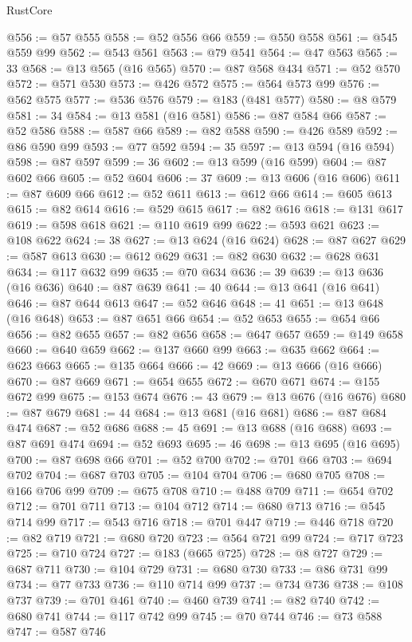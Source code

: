 \begin{lexlean}{RustCore}
\begin{coremodule}
@556 := @57 @555
@558 := @52 @556 @66
@559 := @550 @558
@561 := @545 @559 @99
@562 := @543 @561
@563 := @79 @541
@564 := @47 @563
@565 := 33
@568 := @13 @565 (@16 @565)
@570 := @87 @568 @434
@571 := @52 @570
@572 := @571 @530
@573 := @426 @572
@575 := @564 @573 @99
@576 := @562 @575
@577 := @536 @576
@579 := @183 (@481 @577)
@580 := @8 @579
@581 := 34
@584 := @13 @581 (@16 @581)
@586 := @87 @584 @66
@587 := @52 @586
@588 := @587 @66
@589 := @82 @588
@590 := @426 @589
@592 := @86 @590 @99
@593 := @77 @592
@594 := 35
@597 := @13 @594 (@16 @594)
@598 := @87 @597
@599 := 36
@602 := @13 @599 (@16 @599)
@604 := @87 @602 @66
@605 := @52 @604
@606 := 37
@609 := @13 @606 (@16 @606)
@611 := @87 @609 @66
@612 := @52 @611
@613 := @612 @66
@614 := @605 @613
@615 := @82 @614
@616 := @529 @615
@617 := @82 @616
@618 := @131 @617
@619 := @598 @618
@621 := @110 @619 @99
@622 := @593 @621
@623 := @108 @622
@624 := 38
@627 := @13 @624 (@16 @624)
@628 := @87 @627
@629 := @587 @613
@630 := @612 @629
@631 := @82 @630
@632 := @628 @631
@634 := @117 @632 @99
@635 := @70 @634
@636 := 39
@639 := @13 @636 (@16 @636)
@640 := @87 @639
@641 := 40
@644 := @13 @641 (@16 @641)
@646 := @87 @644 @613
@647 := @52 @646
@648 := 41
@651 := @13 @648 (@16 @648)
@653 := @87 @651 @66
@654 := @52 @653
@655 := @654 @66
@656 := @82 @655
@657 := @82 @656
@658 := @647 @657
@659 := @149 @658
@660 := @640 @659
@662 := @137 @660 @99
@663 := @635 @662
@664 := @623 @663
@665 := @135 @664
@666 := 42
@669 := @13 @666 (@16 @666)
@670 := @87 @669
@671 := @654 @655
@672 := @670 @671
@674 := @155 @672 @99
@675 := @153 @674
@676 := 43
@679 := @13 @676 (@16 @676)
@680 := @87 @679
@681 := 44
@684 := @13 @681 (@16 @681)
@686 := @87 @684 @474
@687 := @52 @686
@688 := 45
@691 := @13 @688 (@16 @688)
@693 := @87 @691 @474
@694 := @52 @693
@695 := 46
@698 := @13 @695 (@16 @695)
@700 := @87 @698 @66
@701 := @52 @700
@702 := @701 @66
@703 := @694 @702
@704 := @687 @703
@705 := @104 @704
@706 := @680 @705
@708 := @166 @706 @99
@709 := @675 @708
@710 := @488 @709
@711 := @654 @702
@712 := @701 @711
@713 := @104 @712
@714 := @680 @713
@716 := @545 @714 @99
@717 := @543 @716
@718 := @701 @447
@719 := @446 @718
@720 := @82 @719
@721 := @680 @720
@723 := @564 @721 @99
@724 := @717 @723
@725 := @710 @724
@727 := @183 (@665 @725)
@728 := @8 @727
@729 := @687 @711
@730 := @104 @729
@731 := @680 @730
@733 := @86 @731 @99
@734 := @77 @733
@736 := @110 @714 @99
@737 := @734 @736
@738 := @108 @737
@739 := @701 @461
@740 := @460 @739
@741 := @82 @740
@742 := @680 @741
@744 := @117 @742 @99
@745 := @70 @744
@746 := @73 @588
@747 := @587 @746

\end{coremodule}
\end{lexlean}
